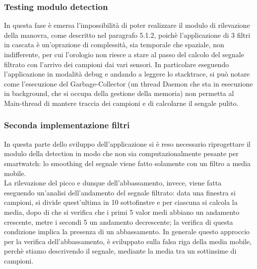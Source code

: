 \documentclass[a4paper]{article}
\begin{document}
\subsubsection{Testing modulo detection}
In questa fase è emersa l'impossibilità di poter realizzare il modulo di rilevazione della manovra, come descritto nel paragrafo 5.1.2, poichè l'applicazione di 3 filtri in cascata è un'oprazione di complessità, sia temporale che spaziale, non indifferente, per cui l'orologio non riesce a stare al passo del calcolo del segnale filtrato con l'arrivo dei campioni dai vari sensori. In particolare eseguendo l'applicazione in modalità debug e andando a leggere lo stacktrace, si può notare come l'esecuzione del Garbage-Collector (un thread Daemon che sta in esecuzione in background, che si occupa della gestione della memoria) non permetta al Main-thread di mantere traccia dei campioni e di calcolarne il sengale pulito.

\subsubsection{Seconda implementazione filtri}
In questa parte dello sviluppo dell'applicazione si è reso necessario riprogettare il modulo della detection in modo che non sia computazionalmente pesante per smartwatch: lo smoothing del segnale viene fatto solamente con un filtro a media mobile. \\
La rilevazione del picco e dunque dell'abbassamento, invece, viene fatta eseguendo un'analisi dell'andamento del segnale filtrato: data una finestra si campioni, si divide quest'ultima in 10 sottofinstre e per ciascuna si calcola la media, dopo di che si verifica che i primi 5 valor medi abbiano un andamento crescente, metre i secondi 5 un andamento decrescente; la verifica di questa condizione implica la presenza di un abbassamento. In generale questo approccio per la verifica dell'abbassamento, è sviluppato sulla falsa riga della media mobile, perchè stiamo descrivendo il segnale, mediante la media tra un sottinsime di campioni.
\vspace{2mm}

\vspace{2mm}
\end{document}
